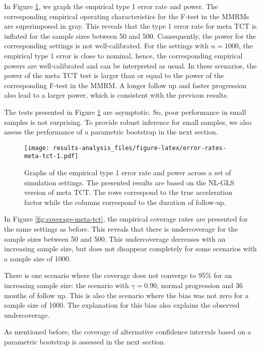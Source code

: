 \documentclass[
]{article}
\begin{document}
In Figure \ref{fig:error-rates-meta-tct}, we graph the empirical type 1 error
rate and power. The corresponding empirical operating characteristics for the
F-test in the MMRMs are superimposed in gray. This reveals that the type 1 error
rate for meta TCT is inflated for the sample sizes between 50 and 500.
Consequently, the power for the corresponding settings is not well-calibrated.
For the settings with \(n = 1000\), the empirical type 1 error is close to
nominal, hence, the corresponding empirical powers are well-calibrated and can
be interpreted as usual. In these scenarios, the power of the meta TCT test is
larger than or equal to the power of the corresponding F-test in the MMRM. A
longer follow up and faster progression also lead to a larger power, which is
consistent with the previous results.

The tests presented in Figure \ref{fig:error-rates-meta-tct} are asymptotic.
So, poor performance in small samples is not surprising. To provide robust
inference for small samples, we also assess the performance of a parametric
bootstrap in the next section.

\begin{figure}
\centering
\texttt{[image: results-analysis\_files/figure-latex/error-rates-meta-tct-1.pdf]}
\caption{\label{fig:error-rates-meta-tct}Graphs of the empirical type 1 error rate and power across a set of simulation settings. The presented results are based on the NL-GLS version of meta TCT. The rows correspond to the true acceleration factor while the columns correspond to the duration of follow-up.}
\end{figure}

In Figure \ref{fig:coverage-meta-tct}, the empirical coverage rates are
presented for the same settings as before. This reveals that there is
undercoverage for the sample sizes between 50 and 500. This undercoverage
decreases with an increasing sample size, but does not disappear completely for
some scenarios with a sample size of 1000.

There is one scenario where the coverage does not converge to 95\% for an
increasing sample size: the scenario with \(\gamma = 0.90\), normal progression
and 36 months of follow up. This is also the scenario where the bias was not
zero for a sample size of 1000. The explanation for this bias also explains the
observed undercoverage.

As mentioned before, the coverage of alternative confidence intervals based on
a parametric bootstrap is assessed in the next section.
\end{document}

